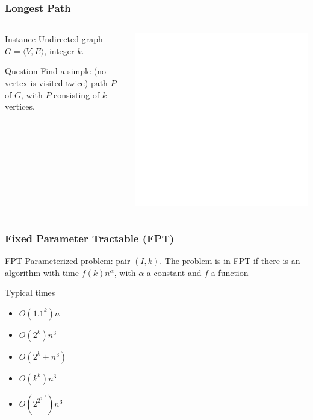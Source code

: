 \documentclass[12pt,aspectratio=169]{beamer}
\begin{document}
\begin{frame}\frametitle{Longest Path}
\begin{columns} 
  \begin{column}{0.48\textwidth}
  \begin{block}{Instance}
    Undirected graph $G=\langle V,E \rangle$, integer $k$.
  \end{block}
  \begin{block}{Question}
    Find a simple (no vertex is visited twice) path $P$ of $G$, with $P$ consisting of $k$
    vertices.
%
  \end{block}
\end{column}
    \begin{column}{0.48\textwidth}
      \centering
  \includegraphics[height=0.7\textheight]{img/Grinberg_5CEC_Nonhamiltonian_graph}
\end{column}
\end{columns}
\end{frame}

\begin{frame}\frametitle{Fixed Parameter Tractable (FPT) }
  \begin{block}{FPT}
    Parameterized problem: pair $(I,k)$.
%
    The problem is in FPT if there is an algorithm with time $f(k)n^{\alpha}$, with
    $\alpha$ a constant and $f$ a function
  \end{block}

  \begin{block}{Typical times}
    \begin{itemize}
    \item
      $O(1.1^{k})n$
    \item
      $O(2^{k})n^{3}$
     \item
      $O(2^{k} + n^{3})$
   \item
      $O(k^{k})n^{3}$
    \item
      $O(2^{2^{2^{...^{2}}}})n^{3}$
    \end{itemize}
  \end{block}
\end{frame} 
\end{document}
